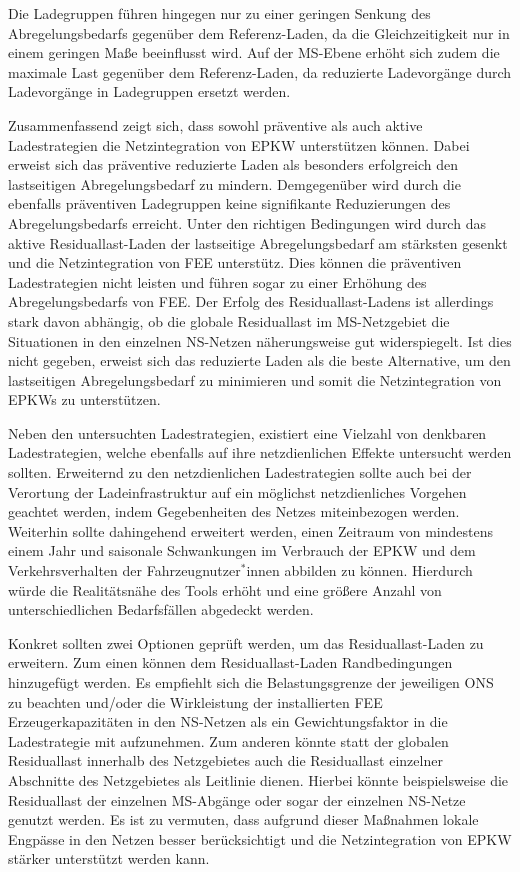 Die Ladegruppen führen hingegen nur zu einer geringen Senkung des Abregelungsbedarfs gegenüber dem Referenz-Laden, da die Gleichzeitigkeit nur in einem geringen Maße beeinflusst wird.
Auf der \gls{MS}-Ebene erhöht sich zudem die maximale Last gegenüber dem Referenz-Laden, da reduzierte Ladevorgänge durch Ladevorgänge in Ladegruppen ersetzt werden.\medskip

Zusammenfassend zeigt sich, dass sowohl präventive als auch aktive Ladestrategien die Netzintegration von \gls{EPKW} unterstützen können.
Dabei erweist sich das präventive reduzierte Laden als besonders erfolgreich den lastseitigen Abregelungsbedarf zu mindern.
Demgegenüber wird durch die ebenfalls präventiven Ladegruppen keine signifikante Reduzierungen des Abregelungsbedarfs erreicht.
Unter den richtigen Bedingungen wird durch das aktive Residuallast-Laden der lastseitige Abregelungsbedarf am stärksten gesenkt und die Netzintegration von \gls{FEE} unterstütz.
Dies können die präventiven Ladestrategien nicht leisten und führen sogar zu einer Erhöhung des Abregelungsbedarfs von \gls{FEE}.
Der Erfolg des Residuallast-Ladens ist allerdings stark davon abhängig, ob die globale Residuallast im \gls{MS}-Netzgebiet die Situationen in den einzelnen \gls{NS}-Netzen näherungsweise gut widerspiegelt.
Ist dies nicht gegeben, erweist sich das reduzierte Laden als die beste Alternative, um den lastseitigen Abregelungsbedarf zu minimieren und somit die Netzintegration von \glspl{EPKW} zu unterstützen.\bigskip

Neben den untersuchten Ladestrategien, existiert eine Vielzahl von denkbaren Ladestrategien, welche ebenfalls auf ihre netzdienlichen Effekte untersucht werden sollten.
Erweiternd zu den netzdienlichen Ladestrategien sollte auch bei der Verortung der Ladeinfrastruktur auf ein möglichst netzdienliches Vorgehen geachtet werden, indem Gegebenheiten des Netzes miteinbezogen werden.
Weiterhin sollte  dahingehend erweitert werden, einen Zeitraum von mindestens einem Jahr und saisonale Schwankungen im Verbrauch der \gls{EPKW} und dem Verkehrsverhalten der Fahrzeugnutzer\(^*\)innen abbilden zu können.
Hierdurch würde die Realitätsnähe des Tools erhöht und eine größere Anzahl von unterschiedlichen Bedarfsfällen abgedeckt werden.\medskip

Konkret sollten zwei Optionen geprüft werden, um das Residuallast-Laden zu erweitern.
Zum einen können dem Residuallast-Laden Randbedingungen hinzugefügt werden.
Es empfiehlt sich die Belastungsgrenze der jeweiligen \gls{ONS} zu beachten und/oder die Wirkleistung der installierten \gls{FEE} Erzeugerkapazitäten in den \gls{NS}-Netzen als ein Gewichtungsfaktor in die Ladestrategie mit aufzunehmen.
Zum anderen könnte statt der globalen Residuallast innerhalb des Netzgebietes auch die Residuallast einzelner Abschnitte des Netzgebietes als Leitlinie dienen.
Hierbei könnte beispielsweise die Residuallast der einzelnen \gls{MS}-Abgänge oder sogar der einzelnen \gls{NS}-Netze genutzt werden.
Es ist zu vermuten, dass aufgrund dieser Maßnahmen lokale Engpässe in den Netzen besser berücksichtigt und die Netzintegration von \gls{EPKW} stärker unterstützt werden kann.

